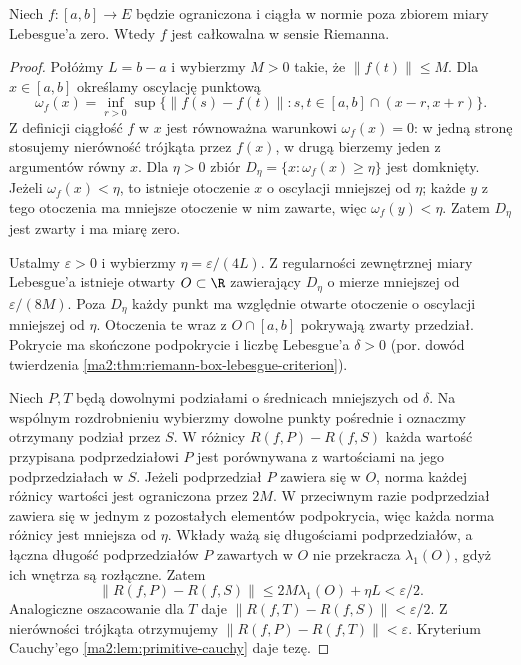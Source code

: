 \begin{twierdzenie}
\label{ma2:thm:vector-riemann-sufficient}
Niech $f:[a,b]\to E$ będzie ograniczona
i ciągła w normie poza zbiorem miary
Lebesgue'a zero. Wtedy $f$ jest całkowalna
w sensie Riemanna.
\end{twierdzenie}
\begin{proof}
Połóżmy $L=b-a$ i wybierzmy $M>0$
takie, że $\|f(t)\|\le M$.
Dla $x\in[a,b]$ określamy oscylację punktową
\[
 \omega_f(x)=\inf_{r>0}\sup\{
 \|f(s)-f(t)\|:s,t\in[a,b]\cap(x-r,x+r)\}.
\]
Z definicji ciągłość $f$ w $x$ jest
równoważna warunkowi $\omega_f(x)=0$:
w jedną stronę stosujemy nierówność
trójkąta przez $f(x)$, w drugą bierzemy
jeden z argumentów równy $x$.
Dla $\eta>0$ zbiór
$D_\eta=\{x:\omega_f(x)\ge\eta\}$
jest domknięty. Jeżeli $\omega_f(x)<\eta$,
to istnieje otoczenie $x$ o oscylacji
mniejszej od $\eta$; każde $y$ z tego
otoczenia ma mniejsze otoczenie w nim
zawarte, więc $\omega_f(y)<\eta$.
Zatem $D_\eta$ jest zwarty i ma miarę zero.

Ustalmy $\varepsilon>0$ i wybierzmy
$\eta=\varepsilon/(4L)$.
Z regularności zewnętrznej miary Lebesgue'a
istnieje otwarty $O\subset\R$ zawierający
$D_\eta$ o mierze mniejszej od $\varepsilon/(8M)$.
Poza $D_\eta$ każdy punkt ma względnie
otwarte otoczenie o oscylacji mniejszej
od $\eta$. Otoczenia te wraz z
$O\cap[a,b]$ pokrywają zwarty przedział.
Pokrycie ma skończone podpokrycie i liczbę
Lebesgue'a $\delta>0$ (por. dowód
twierdzenia \ref{ma2:thm:riemann-box-lebesgue-criterion}).

Niech $P,T$ będą dowolnymi podziałami
o średnicach mniejszych od $\delta$.
Na wspólnym rozdrobnieniu wybierzmy dowolne
punkty pośrednie i oznaczmy otrzymany
podział przez $S$. W różnicy $R(f,P)-R(f,S)$
każda wartość przypisana podprzedziałowi $P$
jest porównywana z wartościami na jego
podprzedziałach w $S$. Jeżeli podprzedział $P$
zawiera się w $O$, norma każdej różnicy wartości jest
ograniczona przez $2M$.
W przeciwnym razie podprzedział zawiera się
w jednym z pozostałych elementów podpokrycia,
więc każda norma różnicy jest mniejsza od $\eta$.
Wkłady ważą się długościami podprzedziałów,
a łączna długość podprzedziałów $P$ zawartych
w $O$ nie przekracza $\lambda_1(O)$, gdyż
ich wnętrza są rozłączne.
Zatem
\[
 \|R(f,P)-R(f,S)\|
 \le 2M\lambda_1(O)+\eta L<\varepsilon/2.
\]
Analogiczne oszacowanie dla $T$ daje
$\|R(f,T)-R(f,S)\|<\varepsilon/2$.
Z nierówności trójkąta otrzymujemy
$\|R(f,P)-R(f,T)\|<\varepsilon$.
Kryterium Cauchy'ego
\ref{ma2:lem:primitive-cauchy} daje tezę.
\end{proof}


